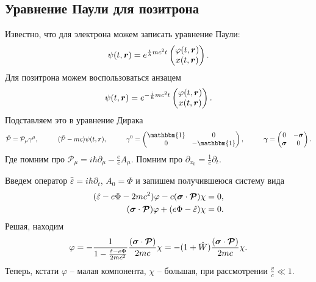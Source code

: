 \subsection*{Уравнение Паули для позитрона}

Известно, что для электрона можем записать уравнение Паули:
\begin{equation*}
	\psi(t, \mbox{\boldmath $r$}) = e^{
		\frac{i}{\hbar} m c^2 t
	} \begin{pmatrix}
		\varphi(t, \mbox{\boldmath $r$}) \\ x(t, \mbox{\boldmath $r$})
	\end{pmatrix}.
\end{equation*}
Для позитрона можем воспользоваться анзацем
\begin{equation*}
	\psi(t, \mbox{\boldmath $r$}) = e^{
		-\frac{i}{\hbar} m c^2 t
	} \begin{pmatrix}
		\varphi(t, \mbox{\boldmath $r$}) \\ x(t, \mbox{\boldmath $r$})
	\end{pmatrix}.
\end{equation*}
Подставляем это в уравнение Дирака
\begin{equation*}
	\mathcal{\tilde{P}} = \mathcal P_\mu \gamma^\mu,
	\hspace{10 mm} 
	(\mathcal{\tilde{P}} - mc) \psi(t, \vc{r}),
	\hspace{10 mm} 
	\gamma^0 = \begin{pmatrix}
		\mathbbm{1} & 0 \\ 0 & - \mathbbm{1}
	\end{pmatrix},
	\hspace{10 mm} 
	\vc{\gamma} = \begin{pmatrix}
	    0 & -\vc{\sigma}  \\
	    \vc{\sigma} & 0  \\
	\end{pmatrix}.
\end{equation*}
Где помним про $\mathcal P_\mu = i \hbar \partial_\mu - \frac{e}{c} A_\mu$.
Помним про $\partial_{x_0} = \frac{1}{c}\partial_t$.

Введем оператор $\hat{\varepsilon} = i \hbar \partial_t$, $A_0 = \Phi$ и запишем получившеюся систему вида
\begin{align*}
	(\hat{\varepsilon} - e \Phi - 2 mc^2) \varphi - c (\mbox{\boldmath $\sigma$} \cdot \mbox{\boldmath $\mathcal P$}) \chi = 0, \\
	(\mbox{\boldmath $\sigma$} \cdot \mbox{\boldmath $\mathcal P$}) \varphi + (e \Phi - \hat{\varepsilon}) \chi = 0.
\end{align*}
Решая, находим
\begin{equation*}
	\varphi = - \frac{1}{1 -\frac{\hat{\varepsilon} - e \Phi}{2 m c^2}}
	\frac{(\mbox{\boldmath $\sigma$} \cdot \mbox{\boldmath $\mathcal P$})}{2 m c} \chi = -
	(1 + \hat{W}) \frac{(\mbox{\boldmath $\sigma$} \cdot \mbox{\boldmath $\mathcal P$})}{2 m c} \chi.
\end{equation*} 
Теперь, кстати $\varphi$ -- малая компонента, $\chi$ -- большая, при рассмотрении $\frac{v}{c} \ll 1$. 

